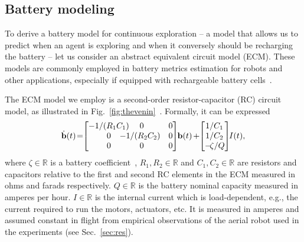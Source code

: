 \documentclass[letterpaper,10pt,conference,twoside]{IEEEtran}
\theoremstyle{definition}
\begin{document}
\subsection{Battery modeling}\label{sec:batt}
\noindent
To derive a battery model for continuous exploration -- a model that allows us to predict when an agent is exploring and when it conversely should be recharging the battery -- let us consider an abstract equivalent circuit model (ECM). These models are commonly employed in battery metrics estimation for robots and other applications, especially if equipped with rechargeable battery cells~\cite{zhang2018online,xiaosong2012comparative,hasan2018exogenous,hinz2019comparison,mousavi2014various,seewald2022energy}.

The ECM model we employ is a second-order resistor-capacitor (RC) circuit model, as illustrated in Fig.~\ref{fig:thevenin}~\cite{seewaldphdthesis}. 
%
Formally, it can be expressed~\cite{zhao2017observability}
\begin{equation}\label{eq:battmodel}
  \dot{\mathbf{b}}(t)\hspace*{-.4ex}=\hspace*{-.7ex}\begin{bmatrix}-1/(R_1C_1)\hspace*{-2ex}&\hspace*{-2ex}0&0\\\hspace*{2ex}0&\hspace*{-3ex}-1/(R_2C_2)&0\\\hspace*{2ex}0&\hspace*{-2ex}0&0\end{bmatrix}\hspace*{-.6ex}\mathbf{b}(t)\hspace*{-.2ex}+\hspace*{-.6ex}\begin{bmatrix}\hspace*{-.2ex}1/C_1\\\hspace*{-.2ex}1/C_2\\-\hspace*{-.4ex}\zeta/Q\end{bmatrix}\hspace*{-.7ex}I(t),
\end{equation}
where $\zeta\in\mathbb{R}$ is a battery coefficient~\cite{seewald2022energy}, $R_1,R_2\in\mathbb{R}$ and $C_1,C_2\in\mathbb{R}$ are resistors and capacitors relative to the first and second RC elements in the ECM measured in ohms and farads respectively.
$Q\in\mathbb{R}$ is the battery nominal capacity measured in amperes per hour. 
%
$I\in\mathbb{R}$ is the internal current which is load-dependent, e.g., the current required to run the motors, actuators, etc. It is measured in amperes and assumed constant in flight from empirical observations of the aerial robot used in the experiments (see Sec.~\ref{sec:res}).
\end{document}
